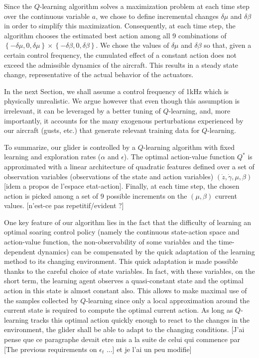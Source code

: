 \documentclass[a4paper, 10pt, conference]{ieeeconf}
\begin{document}
Since the $Q$-learning algorithm solves a maximization problem at each time step over the continuous variable $a$, we chose to define incremental changes $\delta\mu$ and $\delta\beta$ in order to simplify this maximization. Consequently, at each time step, the algorithm chooses the estimated best action among all 9 combinations of $\left\{-\delta\mu,0,\delta\mu\right\}\times\left\{-\delta\beta,0,\delta\beta\right\}$. We chose the values of $\delta\mu$ and $\delta\beta$ so that, given a certain control frequency, the cumulated effect of a constant action does not exceed the admissible dynamics of the aircraft. This results in a steady state change, representative of the actual behavior of the actuators.

In the next Section, we shall assume a control frequency of 1kHz which is physically unrealistic.
We argue however that even though this assumption is irrelevant, it can be leveraged by a better tuning of $Q$-learning, and, more importantly, it accounts for the many exogenous perturbations experienced by our aircraft (gusts, etc.) that generate relevant training data for $Q$-learning.

To summarize, our glider is controlled by a $Q$-learning algorithm with fixed learning and exploration rates ($\alpha$ and $\epsilon$). The optimal action-value function $Q^{*}$ is approximated with a linear architecture of quadratic features defined over a set of observation variables (observations of the state and action variables) $\left(\dot{z}, \dot{\gamma}, \mu, \beta \right)$ {\color{red}[idem a propos de l'espace etat-action]}.
{\color{blue}Finally, at each time step, the chosen action is picked among a set of 9 possible increments on the $\left(\mu, \beta\right)$ current values.} {\color{red}[n'est-ce pas repetitif/evident ?]}

{\color{blue}One key feature of our algorithm lies in the fact that the difficulty of learning an optimal soaring control policy (namely the continuous state-action space and action-value function, the non-observability of some variables and the time-dependent dynamics) can be compensated by the quick adaptation of the learning method to its changing environment. This quick adaptation is made possible thanks to the careful choice of state variables. In fact, with these variables, on the short term, the learning agent observes a quasi-constant state and the optimal action in this state is almost constant also. This allows to make maximal use of the samples collected by $Q$-learning since only a local approximation around the current state is required to compute the optimal current action. As long as $Q$-learning tracks this optimal action quickly enough to react to the changes in the environment, the glider shall be able to adapt to the changing conditions.} {\color{red} [J'ai pense que ce paragraphe devait etre mis a la suite de celui qui commence par [The previous requirements on $\epsilon_t$ ...] et je l'ai un peu modifie]}
\end{document}
